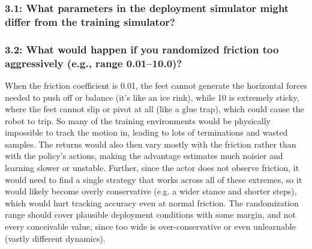 \documentclass[12pt]{article}
\begin{document}
\subsubsection*{3.1: What parameters in the deployment simulator might differ from the training simulator?}
\begin{solution}[height=7cm, overlay unbroken and last={\node[anchor=north west, inner sep=0pt, text width=\tcbtextwidth, align=justify]
  at ([xshift=5mm, yshift=-3mm]interior.north west) {%
Even though vanilla MuJoCo is built from the same robot model and solver settings, it is a different implementation of the physics than mujoco-warp. So the contact and constraint solving could differ, and there is a difference in numerical precision (float32 on GPU vs float64 on CPU). Less saliently, the observations are also rebuilt by a separate implementation from the raw simulator state, so any small discrepancy in how they are computed would show up as a slight input difference. More generally (and especially for sim-to-real), a host of variables can differ, such as foot friction and contact stiffness, link masses, inertias and the center of mass location, actuator properties such as PD gains, torque limits, joint damping and control latency, and sensor properties such as encoder bias and IMU noise. Domain randomization covers several of these directly (friction, COM offset, encoder bias and pushes), and observation noise covers the sensor-level differences, so that a policy trained on this distribution can generalize to the deployment settings.
};}]
\end{solution}

\subsubsection*{3.2: What would happen if you randomized friction too aggressively (e.g., range 0.01--10.0)?}
\begin{solution}[height=7cm]
When the friction coefficient is 0.01, the feet cannot generate the horizontal forces needed to push off or balance (it's like an ice rink), while 10 is extremely sticky, where the feet cannot slip or pivot at all (like a glue trap), which could cause the robot to trip. So many of the training environments would be physically impossible to track the motion in, leading to lots of terminations and wasted samples. The returns would also then vary mostly with the friction rather than with the policy's actions, making the advantage estimates much noisier and learning slower or unstable. Further, since the actor does not observe friction, it would need to find a single strategy that works across all of these extremes, so it would likely become overly conservative (e.g. a wider stance and shorter steps), which would hurt tracking accuracy even at normal friction. The randomization range should cover plausible deployment conditions with some margin, and not every conceivable value, since too wide is over-conservative or even unlearnable (vastly different dynamics).
\end{solution}
\end{document}
